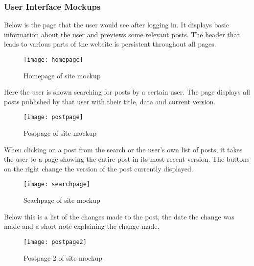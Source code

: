 \subsubsection{User Interface Mockups}
Below is the page that the user would see after logging in. 
It displays basic information about the user and previews some relevant posts.
The header that leads to various parts of the website is persistent throughout all pages.

\begin{figure}[h]
\centering %
\texttt{[image: homepage]} %
\caption{Homepage of site mockup}
\label{fig: homepage} %
\end{figure}
\newpage

\noindent	
Here the user is shown searching for posts by a certain user. 
The page displays all posts published by that user with their title, 
data and current version.

\begin{figure}[h]
\centering %
\texttt{[image: postpage]} %
\caption{Postpage of site mockup}
\label{fig: postpage} %
\end{figure}
\newpage

\noindent	
When clicking on a post from the search or the user's own list of posts, 
it takes the user to a page showing the entire post in its most recent version. The buttons on the right change the version of the post currently displayed.

\begin{figure}[h]
\centering %
\texttt{[image: searchpage]} %
\caption{Seachpage of site mockup}
\label{fig: searchpage} %
\end{figure}
\newpage

\noindent
Below this is a list of the changes made to the post, 
the date the change was made and a short note explaining the change made.

\begin{figure}[h]
\centering %
\texttt{[image: postpage2]} %
\caption{Postpage 2 of site mockup}
\label{fig: postepage2} %
\end{figure}
\newpage
